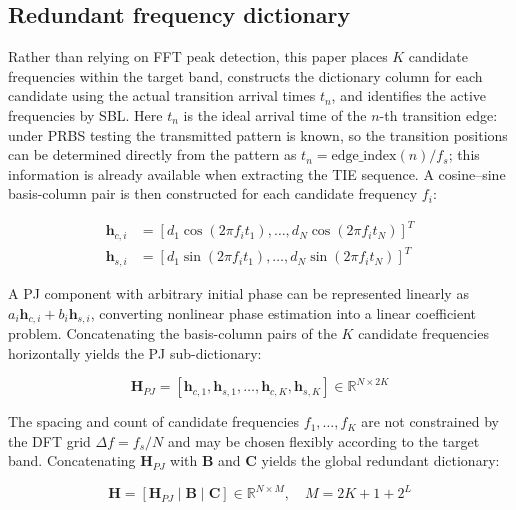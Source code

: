 \documentclass[10pt, a4paper, twocolumn]{article}
\begin{document}
\subsection{Redundant frequency dictionary}

Rather than relying on FFT peak detection, this paper places $K$ candidate frequencies within the target band, constructs the dictionary column for each candidate using the actual transition arrival times $t_n$, and identifies the active frequencies by SBL. Here $t_n$ is the ideal arrival time of the $n$-th transition edge: under PRBS testing the transmitted pattern is known, so the transition positions can be determined directly from the pattern as $t_n = \mathrm{edge\_index}(n)/f_s$; this information is already available when extracting the TIE sequence. A cosine--sine basis-column pair is then constructed for each candidate frequency $f_i$:

\begin{equation}
\begin{aligned}
\mathbf{h}_{c,i} &= [d_1\cos(2\pi f_i t_1), \ldots, d_N\cos(2\pi f_i t_N)]^T \\
\mathbf{h}_{s,i} &= [d_1\sin(2\pi f_i t_1), \ldots, d_N\sin(2\pi f_i t_N)]^T
\end{aligned} \tag{3}
\end{equation}

A PJ component with arbitrary initial phase can be represented linearly as $a_i \mathbf{h}_{c,i} + b_i \mathbf{h}_{s,i}$, converting nonlinear phase estimation into a linear coefficient problem. Concatenating the basis-column pairs of the $K$ candidate frequencies horizontally yields the PJ sub-dictionary:

\begin{equation}
\mathbf{H}_{PJ} = [\mathbf{h}_{c,1}, \mathbf{h}_{s,1}, \ldots, \mathbf{h}_{c,K}, \mathbf{h}_{s,K}] \in \mathbb{R}^{N \times 2K} \tag{4}
\end{equation}

The spacing and count of candidate frequencies $f_1, \ldots, f_K$ are not constrained by the DFT grid $\Delta f = f_s/N$ and may be chosen flexibly according to the target band. Concatenating $\mathbf{H}_{PJ}$ with $\mathbf{B}$ and $\mathbf{C}$ yields the global redundant dictionary:

\begin{equation}
\mathbf{H} = [\mathbf{H}_{PJ} \mid \mathbf{B} \mid \mathbf{C}] \in \mathbb{R}^{N \times M}, \quad M = 2K + 1 + 2^L \tag{5}
\end{equation}
\end{document}
